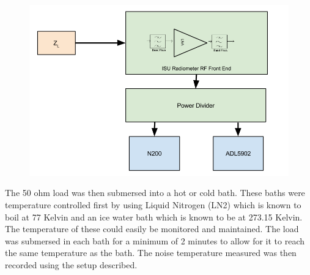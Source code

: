 {\begin{figure}[h!tb] \centering
\includegraphics[width=\textwidth]{Images/Exp_1_Setup.png}
\label{Exp1_Block}
\end{figure}
}

The 50 ohm load was then submersed into a hot or cold bath.  These baths were temperature controlled first by using Liquid Nitrogen (LN2) which is known to boil at 77 Kelvin and an ice water bath which is known to be at 273.15 Kelvin.  The temperature of these could easily be monitored and maintained.  The load was submersed in each bath for a minimum of 2 minutes to allow for it to reach the same temperature as the bath.  The noise temperature measured was then recorded using the setup described.



